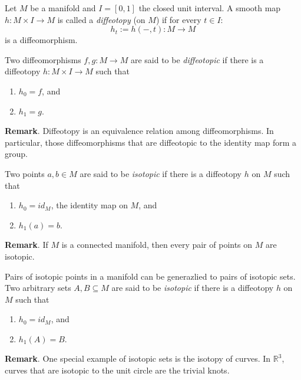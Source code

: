 \documentclass[12pt]{article}
\begin{document}
Let $M$ be a manifold and $I=[0,1]$ the closed unit interval.  A smooth map $h\colon M\times I\rightarrow M$ is called a \emph{diffeotopy} (on $M$) if for every $t\in I$: $$h_t:=h(-,t)\colon M\rightarrow M$$ is a diffeomorphism.

Two diffeomorphisms $f,g\colon M\to M$ are said to be \emph{diffeotopic} if there is a diffeotopy $h\colon M\times I\to M$ such that 
\begin{enumerate}
\item $h_0=f$, and
\item $h_1=g$.
\end{enumerate}

\textbf{Remark}.  Diffeotopy is an equivalence relation among diffeomorphisms.  In particular, those diffeomorphisms that are diffeotopic to the identity map form a group.

Two points $a,b\in M$ are said to be \emph{isotopic} if there is a diffeotopy $h$ on $M$ such that 
\begin{enumerate}
\item $h_0=id_M$, the identity map on $M$, and
\item $h_1(a)=b$.
\end{enumerate}

\textbf{Remark}.  If $M$ is a connected manifold, then every pair of points on $M$ are isotopic.

Pairs of isotopic points in a manifold can be generazlied to pairs of isotopic sets.  Two arbitrary sets $A,B\subseteq M$ are said to be \emph{isotopic} if there is a diffeotopy $h$ on $M$ such that 
\begin{enumerate}
\item $h_0=id_M$, and
\item $h_1(A)=B$.
\end{enumerate}

\textbf{Remark}.  One special example of isotopic sets is the isotopy of curves.  In $\mathbb{R}^3$, curves that are isotopic to the unit circle are the trivial knots.
\end{document}
